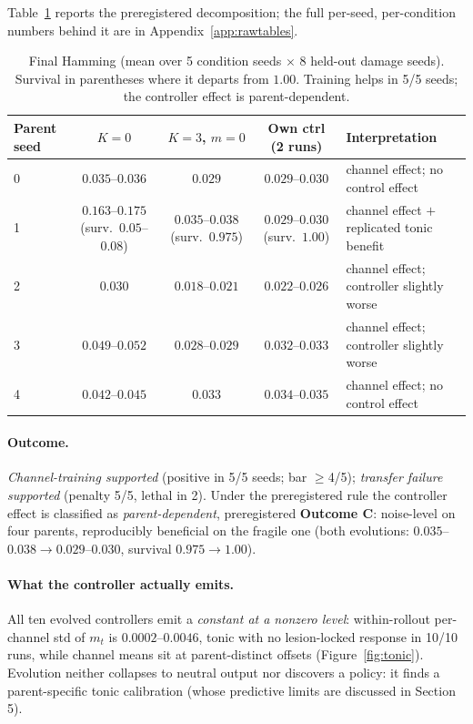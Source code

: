 \documentclass{article}
\begin{document}
Table~\ref{tab:effects} reports the preregistered decomposition; the full
per-seed, per-condition numbers behind it are in
Appendix~\ref{app:rawtables}.

\begin{table}[h]
\centering
\small
\caption{Final Hamming (mean over 5 condition seeds $\times$ 8
held-out damage seeds). Survival in parentheses where it departs from
$1.00$. Training helps in 5/5 seeds; the controller effect is
parent-dependent.}
\label{tab:effects}
\scriptsize
\setlength{\tabcolsep}{2.5pt}
\begin{tabular}{lcccp{1.45in}}
\toprule
Parent seed & $K{=}0$ & $K{=}3$, $m{=}0$ & Own ctrl (2 runs) & Interpretation \\
\midrule
0 & $0.035$--$0.036$ & $0.029$ & $0.029$--$0.030$ & channel effect; no control effect \\
1 & $0.163$--$0.175$ (surv.\ $0.05$--$0.08$) & $0.035$--$0.038$ (surv.\ $0.975$) & $0.029$--$0.030$ (surv.\ $1.00$) & channel effect $+$ replicated tonic benefit \\
2 & $0.030$ & $0.018$--$0.021$ & $0.022$--$0.026$ & channel effect; controller slightly worse \\
3 & $0.049$--$0.052$ & $0.028$--$0.029$ & $0.032$--$0.033$ & channel effect; controller slightly worse \\
4 & $0.042$--$0.045$ & $0.033$ & $0.034$--$0.035$ & channel effect; no control effect \\
\bottomrule
\end{tabular}
\end{table}

\paragraph{Outcome.}
\emph{Channel-training supported} (positive in 5/5 seeds; bar
$\geq$4/5); \emph{transfer failure supported} (penalty 5/5, lethal in
2). Under the preregistered rule the controller effect is classified as
\emph{parent-dependent}, preregistered \textbf{Outcome C}: noise-level
on four parents, reproducibly beneficial on the fragile one
(both evolutions: $0.035$--$0.038 \to 0.029$--$0.030$, survival
$0.975 \to 1.00$).

\paragraph{What the controller actually emits.}
All ten evolved controllers emit a \emph{constant at a nonzero level}:
within-rollout per-channel std of $m_t$ is $0.0002$--$0.0046$, tonic with
no lesion-locked response in 10/10 runs, while channel means sit
at parent-distinct offsets (Figure~\ref{fig:tonic}). Evolution neither collapses to neutral output nor discovers a policy:
it finds a parent-specific tonic calibration (whose predictive limits
are discussed in Section 5).
\end{document}
